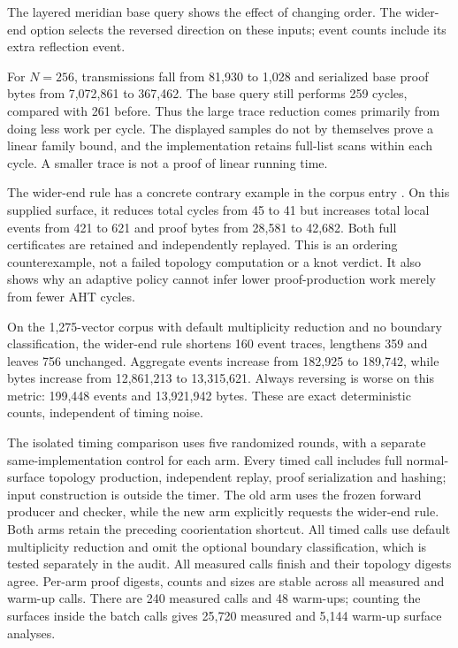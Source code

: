 The layered meridian base query shows the effect of changing order. The
wider-end option selects the reversed direction on these inputs; event
counts include its extra reflection event.


For $N=256$, transmissions fall from 81,930 to 1,028 and serialized base
proof bytes from 7,072,861 to 367,462. The base query still performs 259
cycles, compared with 261 before. Thus the large trace reduction comes
primarily from doing less work per cycle. The displayed samples do not
by themselves prove a linear family bound, and the implementation retains
full-list scans within each cycle. A smaller trace is not a proof of
linear running time.

The wider-end rule has a concrete contrary example in the corpus entry
. On this supplied surface, it
reduces total cycles from 45 to 41 but increases total local events from
421 to 621 and proof bytes from 28,581 to 42,682. Both full certificates
are retained and independently replayed. This is an ordering counterexample,
not a failed topology computation or a knot verdict. It also shows why an
adaptive policy cannot infer lower proof-production work merely from
fewer AHT cycles.

On the 1,275-vector corpus with default multiplicity reduction and no
boundary classification, the wider-end rule shortens 160 event traces,
lengthens 359 and leaves 756 unchanged. Aggregate events increase from
182,925 to 189,742, while bytes increase from 12,861,213 to 13,315,621.
Always reversing is worse on this metric: 199,448 events and 13,921,942
bytes. These are exact deterministic counts, independent of timing noise.

The isolated timing comparison uses five randomized rounds, with a separate
same-implementation control for each arm. Every timed call includes full
normal-surface topology production, independent replay, proof serialization
and hashing; input construction is outside the timer. The old arm uses the
frozen forward producer and checker, while the new arm explicitly requests
the wider-end rule. Both arms retain the preceding coorientation shortcut.
All timed calls use default multiplicity reduction and omit the optional
boundary classification, which is tested separately in the audit.
All measured calls finish and their topology digests agree. Per-arm proof
digests, counts and sizes are stable across all measured and warm-up calls.
There are 240 measured calls and 48 warm-ups; counting the surfaces inside
the batch calls gives 25,720 measured and 5,144 warm-up surface analyses.


